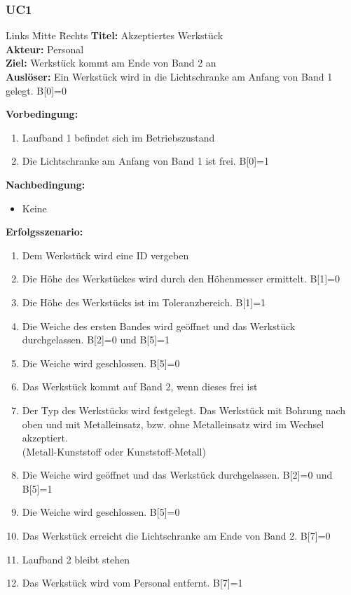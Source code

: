 \documentclass[oneside,a4paper,titlepage]{scrartcl} %
\begin{document}
\subsubsection{UC1}
\begin{tabbing}
 Links \= Mitte \= Rechts \kill
 \textbf{Titel:} \> \> Akzeptiertes Werkstück\\
 \textbf{Akteur:} \> \> Personal\\
 \textbf{Ziel:} \> \> Werkstück kommt am Ende von Band 2 an\\
 \textbf{Auslöser:} \> \> Ein Werkstück wird in die Lichtschranke am Anfang von Band 1 gelegt. B[0]=0\\
\end{tabbing}
\textbf{Vorbedingung:}
\begin{enumerate}
 \item Laufband 1 befindet sich im Betriebszustand
 \item Die Lichtschranke am Anfang von Band 1 ist frei. B[0]=1
\end{enumerate}
\textbf{Nachbedingung:}
\begin{itemize}
    \item Keine
\end{itemize}
\textbf{Erfolgsszenario:}
\begin{enumerate}
 \item Dem Werkstück wird eine ID vergeben
 \item Die Höhe des Werkstückes wird durch den Höhenmesser ermittelt. B[1]=0
 \item Die Höhe des Werkstücks ist im Toleranzbereich. B[1]=1
 \item Die Weiche des ersten Bandes wird geöffnet und das Werkstück durchgelassen. B[2]=0 und B[5]=1
 \item Die Weiche wird geschlossen. B[5]=0
 \item Das Werkstück kommt auf Band 2, wenn dieses frei ist
 \item Der Typ des Werkstücks wird festgelegt. Das Werkstück mit Bohrung nach oben und mit Metalleinsatz, bzw. ohne Metalleinsatz wird im Wechsel akzeptiert.\\
       (Metall-Kunststoff oder Kunststoff-Metall)
 \item Die Weiche wird geöffnet und das Werkstück durchgelassen. B[2]=0 und B[5]=1
 \item Die Weiche wird geschlossen. B[5]=0
 \item Das Werkstück erreicht die Lichtschranke am Ende von Band 2. B[7]=0
 \item Laufband 2 bleibt stehen
 \item Das Werkstück wird vom Personal entfernt. B[7]=1
\end{enumerate}
\end{document}
